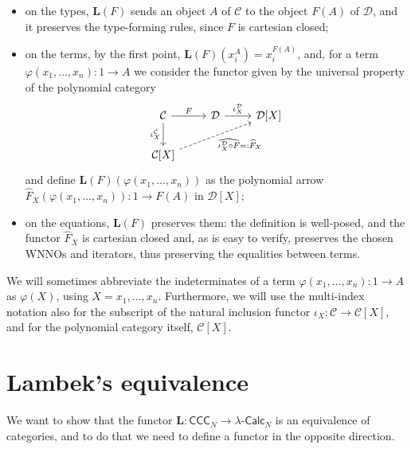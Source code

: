 \begin{example}
\begin{itemize}
        \item on the types, $\mathbf L(F)$ sends an object $A$ of $\mathcal C$ to the object $F(A)$ of $\mathcal D$, and it preserves the type-forming rules, since $F$ is cartesian closed;
        \item on the terms, by the first point, $\mathbf L(F)(x_i^A) = x_i^{F(A)}$, and, for a term $\varphi(x_1,\dots,x_n) : 1 \to A$ we consider the functor given by the universal property of the polynomial category
        \[\begin{tikzcd}
            {\mathcal C} & {\mathcal D} & {\mathcal D[X]} \\
            {\mathcal C[X]}
            \arrow["F", from=1-1, to=1-2]
            \arrow["{\iota_X^{\mathcal C}}"', from=1-1, to=2-1]
            \arrow["{\iota_X^{\mathcal D}}", from=1-2, to=1-3]
            \arrow["{\widehat{\iota_X^{\mathcal D}\circ F}=:\widehat{F}_X}"', dashed, from=2-1, to=1-3]
        \end{tikzcd}\]
        and define $\mathbf L(F)(\varphi(x_1,\dots,x_n))$ as the polynomial arrow $\widehat{F}_X(\varphi(x_1,\dots,x_n)) : 1 \to F(A)$ in $\mathcal D[X]$;
        \item on the equations, $\mathbf L(F)$ preserves them: the definition is well-posed, and the functor $\widehat{F}_X$ is cartesian closed and, as is easy to verify, preserves the chosen WNNOs and iterators, thus preserving the equalities between terms.
    \end{itemize}
\end{example}

\begin{notation}\label{idx:multi-index}
    We will sometimes abbreviate the indeterminates of a term $\varphi(x_1,\dots,x_n) : 1 \to A$ as $\varphi(X)$, using $X = x_1,\dots,x_n$. Furthermore, we will use the multi-index notation also for the subscript of the natural inclusion functor $\iota_X : \mathcal C \to \mathcal C[X]$, and for the polynomial category itself, $\mathcal C[X]$.
\end{notation}

\section{Lambek's equivalence}
We want to show that the functor $\mathbf L : \mathsf{CCC}_N \to \lambda\text{-}\mathsf{Calc}_N$ is an equivalence of categories, and to do that we need to define a functor in the opposite direction.

